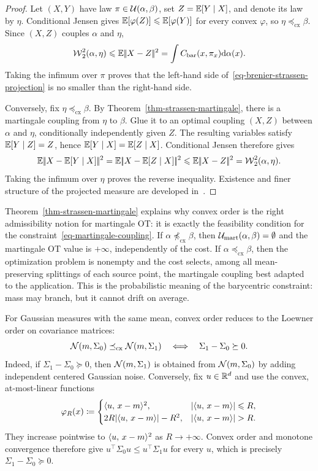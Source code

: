 \begin{proof}
	Let $(X,Y)$ have law $\pi\in\mathcal{U}(\alpha,\beta)$, set $Z=\mathbb{E}[Y\mid X]$, and denote its law by $\eta$. Conditional Jensen gives
	\(\mathbb{E}[\varphi(Z)] \leqslant \mathbb{E}[\varphi(Y)]\)
	for every convex $\varphi$, so $\eta\preceq_{\mathrm{cx}}\beta$. Since $(X,Z)$ couples $\alpha$ and $\eta$,
	\[
		\operatorname{\mathcal{W}}_2^2(\alpha,\eta)
		\leqslant
		\mathbb{E}|\!| X-Z |\!|^2
		=
		\int C_{\mathrm{bar}}(x,\pi_x)\mathrm{d}\alpha(x).
	\]
	Taking the infimum over $\pi$ proves that the left-hand side of~\eqref{eq-brenier-strassen-projection} is no smaller than the right-hand side.

	Conversely, fix $\eta\preceq_{\mathrm{cx}}\beta$. By Theorem~\ref{thm-strassen-martingale}, there is a martingale coupling from $\eta$ to $\beta$. Glue it to an optimal coupling $(X,Z)$ between $\alpha$ and $\eta$, conditionally independently given $Z$. The resulting variables satisfy $\mathbb{E}[Y\mid Z]=Z$, hence
	\(\mathbb{E}[Y\mid X]=\mathbb{E}[Z\mid X]\).
	Conditional Jensen therefore gives
	\[
		\mathbb{E}|\!| X-\mathbb{E}[Y\mid X] |\!|^2
		=
		\mathbb{E}|\!| X-\mathbb{E}[Z\mid X] |\!|^2
		\leqslant
		\mathbb{E}|\!| X-Z |\!|^2
		=
		\operatorname{\mathcal{W}}_2^2(\alpha,\eta).
	\]
	Taking the infimum over $\eta$ proves the reverse inequality. Existence and finer structure of the projected measure are developed in~\cite{backhoff2019weak}.
\end{proof}

Theorem~\ref{thm-strassen-martingale} explains why convex order is the right admissibility notion for martingale OT: it is exactly the feasibility condition for the constraint~\eqref{eq-martingale-coupling}. If $\alpha\not\preceq_{\mathrm{cx}}\beta$, then $\mathcal{U}_{\mathrm{mart}}(\alpha,\beta)=\emptyset$ and the martingale OT value is $+\infty$, independently of the cost. If $\alpha\preceq_{\mathrm{cx}}\beta$, then the optimization problem is nonempty and the cost selects, among all mean-preserving splittings of each source point, the martingale coupling best adapted to the application. This is the probabilistic meaning of the barycentric constraint: mass may branch, but it cannot drift on average.

For Gaussian measures with the same mean, convex order reduces to the Loewner order on covariance matrices:
\[
	\mathcal{N}(m,\Sigma_0)\preceq_{\mathrm{cx}}\mathcal{N}(m,\Sigma_1)
	\quad\Longleftrightarrow\quad
	\Sigma_1-\Sigma_0\succeq0.
\]
Indeed, if $\Sigma_1-\Sigma_0\succeq0$, then $\mathcal{N}(m,\Sigma_1)$ is obtained from $\mathcal{N}(m,\Sigma_0)$ by adding independent centered Gaussian noise. Conversely, fix $u\in\mathbb{R}^d$ and use the convex, at-most-linear functions
\[
	\varphi_R(x)
	\eqdef
	\begin{cases}
		\dotp{u}{x-m}^2, & |\dotp{u}{x-m}|\leq R,\\
		2R|\dotp{u}{x-m}|-R^2, & |\dotp{u}{x-m}|>R.
	\end{cases}
\]
They increase pointwise to $\langle u,\,x-m\rangle^2$ as $R\to+\infty$. Convex order and monotone convergence therefore give $u^\top\Sigma_0u\leq u^\top\Sigma_1u$ for every $u$, which is precisely $\Sigma_1-\Sigma_0\succeq0$.

